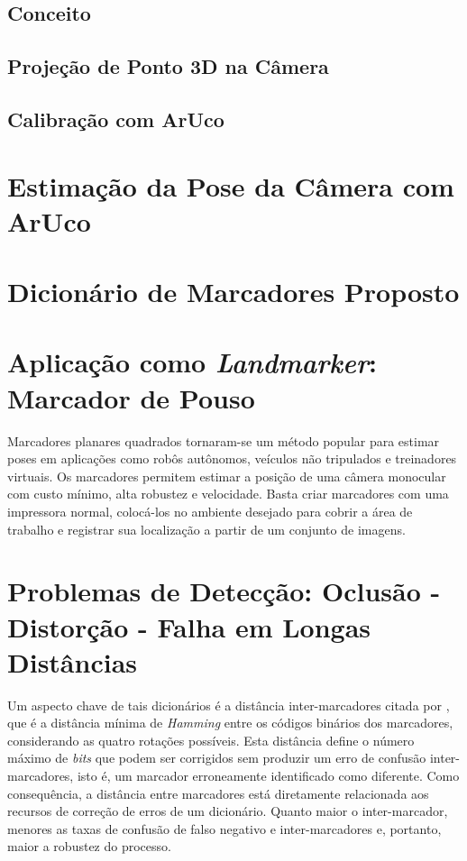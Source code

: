 \subsection{Conceito}

\subsection{Projeção de Ponto 3D na Câmera}

\subsection{Calibração com ArUco}

\section{Estimação da Pose da Câmera com ArUco}

\section{Dicionário de Marcadores Proposto}

\section{Aplicação como \textit{Landmarker}: Marcador de Pouso}

Marcadores planares quadrados tornaram-se um método popular para estimar poses em aplicações como robôs autônomos, veículos não tripulados e treinadores virtuais. Os marcadores permitem estimar a posição de uma câmera monocular com custo mínimo, alta robustez e velocidade. Basta criar marcadores com uma impressora normal, colocá-los no ambiente desejado para cobrir a área de trabalho e registrar sua localização a partir de um conjunto de imagens.

\section{Problemas de Detecção: Oclusão - Distorção - Falha em Longas Distâncias}

Um aspecto chave de tais dicionários é a distância inter-marcadores citada por \citet{Fiala2010}, que é a distância mínima de \textit{Hamming} entre os códigos binários dos marcadores, considerando as quatro rotações possíveis. Esta distância define o número máximo de \textit{bits} que podem ser corrigidos sem produzir um erro de confusão inter-marcadores, isto é, um marcador erroneamente identificado como diferente. Como consequência, a distância entre marcadores está diretamente relacionada aos recursos de correção de erros de um dicionário. Quanto maior o inter-marcador, menores as taxas de confusão de falso negativo e inter-marcadores e, portanto, maior a robustez do processo.

